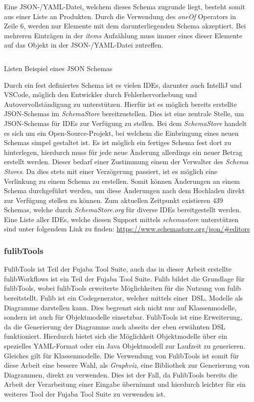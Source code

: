 Eine JSON-/YAML-Datei, welchem dieses Schema zugrunde liegt, besteht somit aus einer Liste an Produkten.
Durch die Verwendung des \textit{oneOf} Operators in Zeile 6, werden nur Elemente mit dem darunterliegenden Schema akzeptiert.
Bei mehreren Einträgen in der \textit{items} Aufzählung muss immer eines dieser Elemente auf das Objekt in der JSON-/YAML-Datei zutreffen.

\begin{listing}[!ht]
    \inputminted{json}{listings/2.2.1/list.schema.json}
    \caption{Listen Beispiel eines JSON Schemas}
    \label{listing:listSchema}
\end{listing}

Durch ein fest definiertes Schema ist es vielen IDEs, darunter auch IntelliJ und VSCode,
möglich den Entwickler durch Fehlerhervorhebung und Autovervollständigung zu unterstützen.
Hierfür ist es möglich bereits erstellte JSON-Schemas im \textit{SchemaStore} bereitzustellen.
Dies ist eine zentrale Stelle, um JSON-Schemas für IDEs zur Verfügung zu stellen.
Bei dem \textit{SchemaStore} handelt es sich um ein Open-Source-Projekt, bei welchem die Einbringung eines neuen Schemas simpel gestaltet ist.
Es ist möglich ein fertiges Schema fest dort zu hinterlegen, hierdurch muss für jede neue Änderung allerdings ein neuer Betrag erstellt werden.
Dieser bedarf einer Zustimmung einem der Verwalter des \textit{Schema Stores}.
Da dies stets mit einer Verzögerung passiert, ist es möglich eine Verlinkung zu einem Schema zu erstellen.
Somit können Änderungen an einem Schema durchgeführt werden, um diese Änderungen nach dem Hochladen direkt zur Verfügung stellen zu können.
Zum aktuellen Zeitpunkt existieren 439 Schemas, welche durch \textit{SchemaStore.org} für diverse IDEs bereitgestellt werden.\cite*{schemaStore}
Eine Liste aller IDEs, welche diesen Support mittels \textit{schemastore} unterstützen sind unter folgendem
Link zu finden: \url{https://www.schemastore.org/json/#editors}

\subsubsection{fulibTools}
FulibTools ist Teil der Fujaba Tool Suite, auch das in dieser Arbeit erstellte fulibWorkflows ist ein Teil der Fujaba Tool Suite.
Fulib bildet die Grundlage für fulibTools, wobei fulibTools erweiterte Möglichkeiten für die Nutzung von fulib bereitstellt.
Fulib ist ein Codegenerator, welcher mittels einer~\ac{DSL}, Modelle als Diagramme darstellen kann.\cite*{fulib}
Dies begrenzt sich nicht nur auf Klassenmodelle, sondern ist auch für Objektmodelle einsetzbar.
FulibTools ist eine Erweiterung, da die Generierung der Diagramme auch abseits der eben erwähnten DSL funktioniert.\cite*{fulibTools}
Hierdurch bietet sich die Möglichkeit Objektmodelle über ein spezielles YAML-Format oder ein Java Objektmodell zur Laufzeit zu generieren.
Gleiches gilt für Klassenmodelle.
Die Verwendung von FulibTools ist somit für diese Arbeit eine bessere Wahl, als \textit{Graphviz}, eine Bibliothek zur Generierung von Diagrammen, direkt zu verwenden.
Dies ist der Fall, da FulibTools bereits die Arbeit der Verarbeitung einer Eingabe übernimmt und hierdurch leichter für ein weiteres Tool der Fujaba Tool Suite zu verwenden ist.
